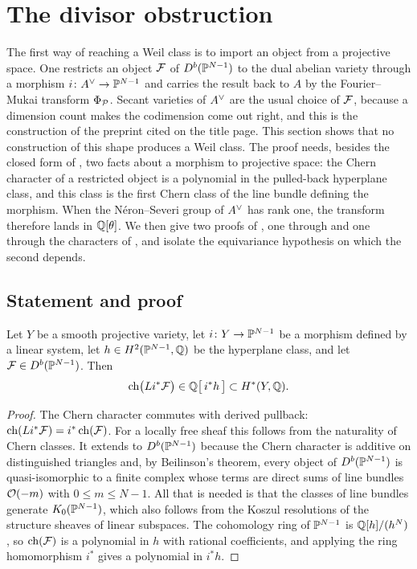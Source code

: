 \section{The divisor obstruction}\label{sec:divisor}

The first way of reaching a Weil class is to import an object from a
projective space. One restricts an object $\mathcal{F}$ of $D^{b}(\mathbb{P}^{N-1})$ to the
dual abelian variety through a morphism $i\colon A^{\vee}\to\mathbb{P}^{N-1}$ and carries
the result back to $A$ by the Fourier--Mukai transform $\Phi_{\mathcal{P}}$. Secant
varieties of $A^{\vee}$ are the usual choice of $\mathcal{F}$, because a dimension count
makes the codimension come out right, and this is the construction of the
preprint cited on the title page. This section shows that no construction of
this shape produces a Weil class. The proof needs, besides the closed form of
, two facts about a morphism to projective space: the Chern
character of a restricted object is a polynomial in the pulled-back
hyperplane class, and this class is the first Chern class of the line bundle
defining the morphism. When the N\'eron--Severi group of $A^{\vee}$ has rank one,
the transform therefore lands in $\mathbb{Q}[\theta]$. We then give two proofs of
, one through  and one through the
characters of , and isolate the equivariance hypothesis
on which the second depends.

\subsection{Statement and proof}

\begin{lemma}\label{lem:ambient}
Let $Y$ be a smooth projective variety, let $i\colon Y\to\mathbb{P}^{N-1}$ be a
morphism defined by a linear system, let $h\in H^{2}(\mathbb{P}^{N-1},\mathbb{Q})$ be the
hyperplane class, and let $\mathcal{F}\in D^{b}(\mathbb{P}^{N-1})$. Then
\[
  \operatorname{ch}\bigl(Li^{*}\mathcal{F}\bigr)\in\mathbb{Q}\bigl[\,i^{*}h\,\bigr]\subset H^{*}(Y,\mathbb{Q}).
\]
\end{lemma}

\begin{proof}
The Chern character commutes with derived pullback:
$\operatorname{ch}(Li^{*}\mathcal{F})=i^{*}\operatorname{ch}(\mathcal{F})$. For a locally free sheaf this follows from
the naturality of Chern classes. It extends to $D^{b}(\mathbb{P}^{N-1})$ because the
Chern character is additive on distinguished triangles and, by Beilinson's
theorem, every object of $D^{b}(\mathbb{P}^{N-1})$ is quasi-isomorphic to a finite
complex whose terms are direct sums of line bundles $\mathcal{O}(-m)$ with
$0\le m\le N-1$. All that is needed is that the classes of line bundles
generate $K_{0}(\mathbb{P}^{N-1})$, which also follows from the Koszul resolutions
of the structure sheaves of linear subspaces. The cohomology ring of
$\mathbb{P}^{N-1}$ is $\mathbb{Q}[h]/(h^{N})$, so $\operatorname{ch}(\mathcal{F})$ is a polynomial in $h$ with
rational coefficients, and applying the ring homomorphism $i^{*}$ gives a
polynomial in $i^{*}h$.
\end{proof}

